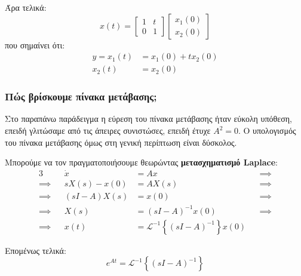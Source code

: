 \documentclass[11pt,a4paper,notitlepage,fleqn]{article}
\begin{document}
\begin{exercise}[Παράδειγμα]
	Άρα τελικά:
	\[
	x(t) = \left[\begin{matrix}
	1 & t \\ 0 & 1
	\end{matrix}\right]\left[\begin{matrix}
	x_1(0) \\ x_2(0)
	\end{matrix}\right]
	\]
	που σημαίνει ότι:
	\begin{align*}
		y = x_1(t) &= x_1(0) + tx_2(0)\\
		x_2(t) &= x_2(0)
	\end{align*}
	
\end{exercise}

\subsubsection{Πώς βρίσκουμε πίνακα μετάβασης;}

Στο παραπάνω παράδειγμα η εύρεση του πίνακα μετάβασης ήταν εύκολη υπόθεση, επειδή γλιτώσαμε από τις άπειρες
συνιστώσες, επειδή έτυχε \( A^2 = 0 \). Ο υπολογισμός του πίνακα μετάβασης όμως στη γενική περίπτωση είναι
δύσκολος.

Μπορούμε να τον πραγματοποιήσουμε θεωρώντας \textbf{μετασχηματισμό Laplace}:
\begin{alignat*}{3}
	&& \dot x &= Ax &&\implies \\
	\implies && sX(s) - x(0) &= AX(s) &&\implies \\
	\implies && (sI-A)X(s) &= x(0) &&\implies \\
	\implies && X(s) &= (sI-A)^{-1} x(0) &&\implies \\
	\implies && x(t) &= \mathscr L^{-1} \left\lbrace (sI-A)^{-1} \right\rbrace x(0)
\end{alignat*}

Επομένως τελικά:
\[
\boxed{e^{At} = \mathscr{L}^{-1} \left\lbrace (sI-A)^{-1} \right\rbrace}
\]
\end{document}
